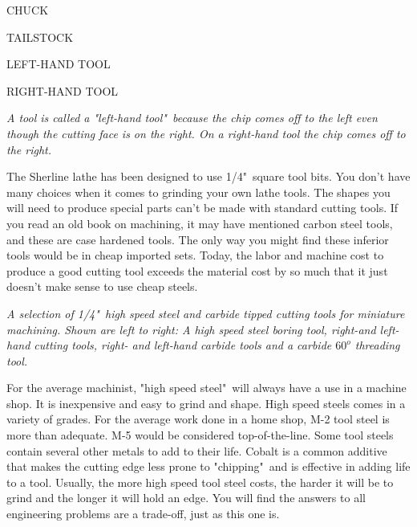 \bigskip
CHUCK

TAILSTOCK

LEFT-HAND TOOL

RIGHT-HAND TOOL

\bigskip

\textit{A tool is called a "left-hand tool"\ because the chip comes off to the
left even though the cutting face is on the right. On a right-hand tool the chip
comes off to the right.}


The Sherline lathe has been designed to use 1/4"\ square tool bits. You don't
have many choices when it comes to grinding your own lathe tools. The shapes you
will need to produce special parts can't be made with standard cutting tools. If
you read an old book on machining, it may have mentioned carbon steel tools, and
these are case hardened tools. The only way you might find these inferior tools
would be in cheap imported sets. Today, the labor and machine cost to produce a
good cutting tool exceeds the material cost by so much that it just doesn't make
sense to use cheap steels.

\bigskip
\textit{A selection of 1/4"\ high speed steel and carbide tipped cutting tools
for miniature machining. Shown are left to right: A high speed steel boring
tool, right-and left-hand cutting tools, right- and left-hand carbide tools and
a carbide $60^o$ threading tool.}


For the average machinist, "high speed steel"\ will always have a use in a
machine shop. It is inexpensive and easy to grind and shape. High speed steels
comes in a variety of grades. For the average work done in a home shop, M-2 tool
steel is more than adequate. M-5 would be considered top-of-the-line. Some tool
steels contain several other metals to add to their life. Cobalt is a common
additive that makes the cutting edge less prone to "chipping"\ and is effective
in adding life to a tool. Usually, the more high speed tool steel costs, the
harder it will be to grind and the longer it will hold an edge. You will find
the answers to all engineering problems are a trade-off, just as this one is.


